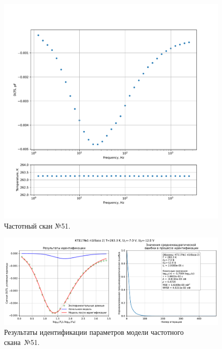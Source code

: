 \begin{figure}[!ht]
    \centering
    \includegraphics[width=1\textwidth]{../plots/КТ117№1_п1(база 2)_2500Гц-1Гц_1пФ_-10С_-7В-12В_100мВ_20мкс_шаг_0,1.pdf}
    \caption{Частотный скан №51.}
    \label{pic:frequency_scan_51}
\end{figure}

\begin{figure}[!ht]
    \centering
    \includegraphics[width=1\textwidth]{../plots/КТ117№1_п1(база 2)_2500Гц-1Гц_1пФ_-10С_-7В-12В_100мВ_20мкс_шаг_0,1_model.pdf}
    \caption{Результаты идентификации параметров модели частотного скана~№51.}
    \label{pic:frequency_scan_model51}
\end{figure}

\pagebreak


